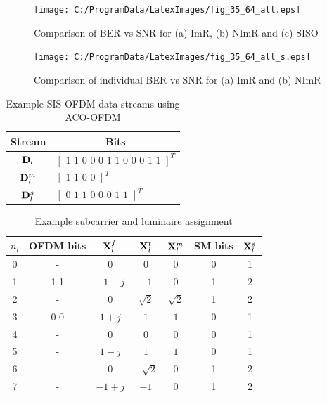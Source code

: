 \documentclass[12pt,letterpaper,onecolumn]{article} %
\newcommand{\vm}[1]{{\bf{#1}}}
\begin{document}
\newpage
\begin{figure}[htp]
	\centering
		\texttt{[image: C:/ProgramData/LatexImages/fig\_35\_64\_all.eps]}
	\caption{Comparison of BER vs SNR for (a) ImR, (b) NImR and (c) SISO}
\end{figure}

\newpage
\begin{figure}[htp]
	\centering
		\texttt{[image: C:/ProgramData/LatexImages/fig\_35\_64\_all\_s.eps]}
	\caption{Comparison of individual BER vs SNR for (a) ImR and (b) NImR}
\end{figure}

\setcounter{table}{0}
\newpage
\begin{table}[htp]
	\centering
		\begin{tabular}{|c|l|}
			\hline
			{\bf{Stream}}&\multicolumn{1}{|c|}{\bf{Bits}}\\
			\hline
			$\vm{D}_l$ & $\left[\text{ 1 1 0 0 0 1 1 0 0 0 1 1 }\right]^T $\\
			\hline
			$\vm{D}_l^m$ & $\left[\text{ 1 1 0 0 }\right]^T $\\
			\hline
			$\vm{D}_l^s$ & $\left[\text{ 0 1 1 0 0 0 1 1 }\right]^T $\\
			\hline
		\end{tabular}
	\caption{Example SIS-OFDM data streams using ACO-OFDM}
	\label{tabExBits}
\end{table}

\newpage
\begin{table}[htp]
	\centering
      \begin{tabular}{|c|c|c|c|c|c|c|}
			\hline
			{ $n_l$ }&{\bf{OFDM bits}}&$\vm{X}_l^f$&$\vm{X}^t_l$&$\vm{X}^m_l$&{\bf{SM bits}}&$\vm{X}^s_l$\\
			\hline
			0 & - & 0 & 0 & 0 &0 & 1\\
			\hline
			1 & 1 1 & $-1-j$ & $-1$ & 0 &1 & 2\\
			\hline
			2 & - & 0 & $\sqrt{2}$ & $\sqrt{2}$ &1 & 2\\
			\hline
			3 & 0 0 & $1+j$ & $1$ & $1$ & 0& 1\\
			\hline
			4 &-& 0 & 0 & 0 &0 & 1\\
			\hline
			5 &-& $1-j$ & $1$ & $1$ &0 & 1\\
			\hline
			6 &-& 0 & $-\sqrt{2}$ & 0 & 1& 2\\
			\hline
			7 &-& $-1+j$ & $-1$ & 0 &1 & 2\\
			\hline
		\end{tabular}
	\caption{Example subcarrier and luminaire assignment}
	\label{tabExample}
\end{table}
\end{document}
